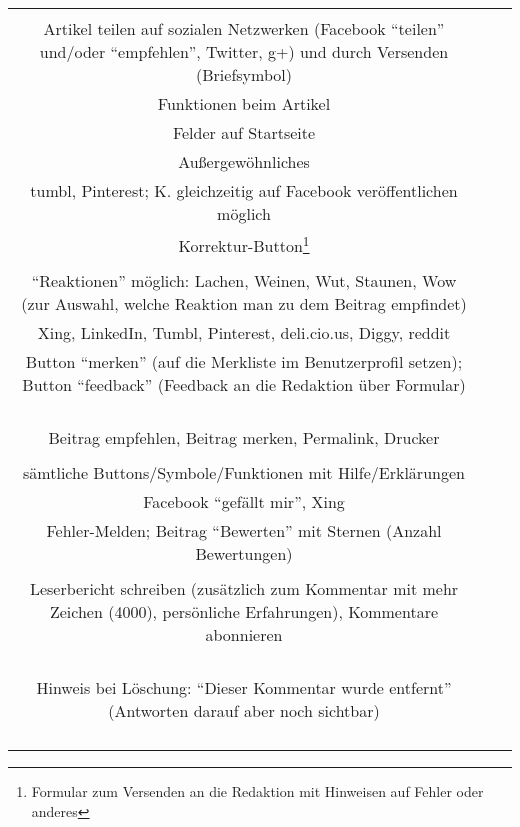 \begin{landscape}
\begin{tabular}{ccc}
{{		


		
Sonstiges\\ 
Artikel teilen auf sozialen Netzwerken (Facebook ``teilen'' und/oder ``empfehlen'', Twitter, g+) und durch Versenden (Briefsymbol)\\
Funktionen beim Artikel\\
Felder auf Startseite\\
Außergewöhnliches
&		%
		\\
		tumbl, Pinterest; K. gleichzeitig auf Facebook veröffentlichen möglich \\
		Korrektur-Button\footnote{Formular zum Versenden an die Redaktion mit Hinweisen auf Fehler oder anderes}\\
		\\
		``Reaktionen'' möglich: Lachen, Weinen, Wut, Staunen, Wow (zur Auswahl, welche Reaktion man zu dem Beitrag empfindet)
		&
		\\
		Xing, LinkedIn, Tumbl, Pinterest, deli.cio.us, Diggy, reddit\\
		Button ``merken'' (auf die Merkliste im Benutzerprofil setzen); Button ``feedback'' (Feedback an die Redaktion über Formular) \\
		\\
		\\
		&
		\\
		\\
		Beitrag empfehlen, Beitrag merken, Permalink, Drucker\\
		\\
		sämtliche Buttons/Symbole/Funktionen mit Hilfe/Erklärungen
		&
		\\
		Facebook ``gefällt mir'', Xing\\
		Fehler-Melden; Beitrag ``Bewerten'' mit Sternen (Anzahl Bewertungen)\\
		\\
		Leserbericht schreiben (zusätzlich zum Kommentar mit mehr Zeichen (4000), persönliche Erfahrungen), Kommentare abonnieren\\
		&
		\\
		\\
		\\
		\\
		Hinweis bei Löschung: ``Dieser Kommentar wurde entfernt'' (Antworten darauf aber noch sichtbar)\\
		&
		\\
		\\
		\\
}}
\end{tabular}
\end{landscape}
